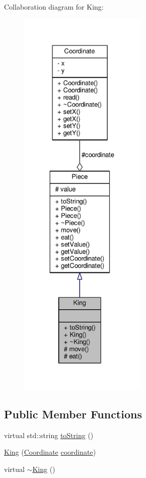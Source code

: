 Collaboration diagram for King\+:\nopagebreak
\begin{figure}[H]
\begin{center}
\leavevmode
\includegraphics[height=550pt]{class_king__coll__graph}
\end{center}
\end{figure}
\subsection*{Public Member Functions}
\begin{DoxyCompactItemize}
\item 
virtual std\+::string \hyperlink{class_king_a445fa11a84a95f5257eea4fb0a4f4839}{to\+String} ()
\item 
\hyperlink{class_king_a61f66f3da9c9b8cda2541fb3e1be8743}{King} (\hyperlink{class_coordinate}{Coordinate} \hyperlink{class_piece_a9e92373c8fffc1f5efb20d62204b70cf}{coordinate})
\item 
virtual \hyperlink{class_king_aac368ce96e2b12f62e3608d27262e941}{$\sim$\+King} ()
\end{DoxyCompactItemize}
